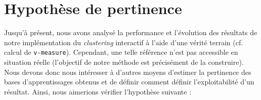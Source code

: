 \section{Hypothèse de pertinence}
\label{section:4.4-HYPOTHESE-PERTINENCE}

	Jusqu'à présent, nous avons analysé la performance et l'évolution des résultats de notre implémentation du \textit{clustering} interactif à l'aide d'une vérité terrain (cf. calcul de \texttt{v-measure}).
	Cependant, une telle référence n'est pas accessible en situation réelle (l'objectif de notre méthode est précisément de la construire).
	Nous devons donc nous intéresser à d'autres moyens d'estimer la pertinence des bases d'apprentissages obtenus et de définir comment définir l'exploitabilité d'un résultat.
	Ainsi, nous aimerions vérifier l'hypothèse suivante :
	

